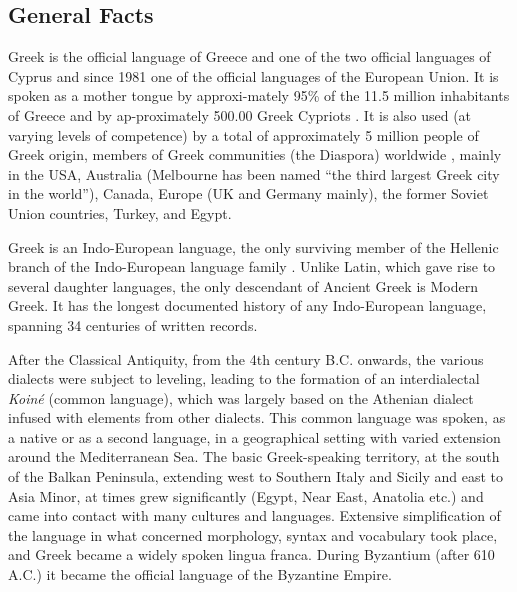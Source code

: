 \documentclass[]{../../metanetpaper}
\begin{document}
\clearpage


\begin{multicols}{2}

\subsection{General Facts}

Greek is the official language of Greece and one of the two official languages of Cyprus and since 1981 one of the official languages of the European Union. It is spoken as a mother tongue by approxi-mately 95\% of the 11.5 million inhabitants of Greece and by ap-proximately 500.00 Greek Cypriots \cite{Stat1}. It is also used (at varying levels of competence) by a total of approximately 5 million people of Greek origin, members of Greek communities (the Diaspora) worldwide  \cite{Dias1}, mainly in the USA, Australia (Melbourne has been named “the third largest Greek city in the world”), Canada, Europe (UK and Germany mainly), the former Soviet Union countries, Turkey, and Egypt. 

Greek is an Indo-European language, the only surviving member of the Hellenic branch of the Indo-European language family \cite{Trud1}. Unlike Latin, which gave rise to several daughter languages, the only descendant of Ancient Greek is Modern Greek. It has the longest documented history of any Indo-European language, spanning 34 centuries of written records.

After the Classical Antiquity, from the 4th century B.C. onwards, the various dialects were subject to leveling, leading to the formation of an interdialectal \textit{Koiné} (common language), which was largely based on the Athenian dialect infused with elements from other dialects. This common language was spoken, as a native or as a second language, in a geographical setting with varied extension around the Mediterranean Sea. The basic Greek-speaking territory, at the south of the Balkan Peninsula, extending west to Southern Italy and Sicily and east to Asia Minor, at times grew significantly (Egypt, Near East, Anatolia etc.) and came into contact with many cultures and languages. Extensive simplification of the language in what concerned morphology, syntax and vocabulary took place, and Greek became a widely spoken lingua franca. During Byzantium (after 610 A.C.) it became the official language of the Byzantine Empire.


\end{multicols}
\end{document}
